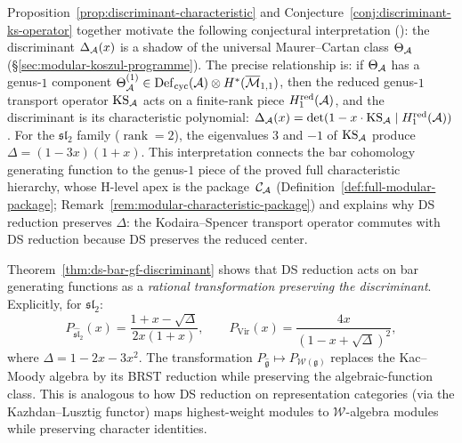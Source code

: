 \begin{remark}\label{rem:discriminant-universal-class}
Proposition~\ref{prop:discriminant-characteristic} and
Conjecture~\ref{conj:discriminant-ks-operator} together motivate the
following conjectural interpretation (\ClaimStatusConjectured): the
discriminant $\Delta_{\mathcal{A}}(x)$ is a shadow of the universal
Maurer--Cartan class $\Theta_{\mathcal{A}}$
(\S\ref{sec:modular-koszul-programme}).  The precise relationship
is: if $\Theta_{\mathcal{A}}$ has a genus-$1$ component
$\Theta_{\mathcal{A}}^{(1)} \in \operatorname{Def}_{\mathrm{cyc}}(\mathcal{A})
\otimes H^*(\overline{\mathcal{M}}_{1,1})$, then the reduced
genus-$1$ transport operator $\operatorname{KS}_{\mathcal{A}}$ acts on
a finite-rank piece $H^{\mathrm{red}}_1(\mathcal{A})$, and the
discriminant is its characteristic polynomial:
$\Delta_{\mathcal{A}}(x) = \det(1 - x \cdot \operatorname{KS}_{\mathcal{A}}
\mid H^{\mathrm{red}}_1(\mathcal{A}))$.  For the $\mathfrak{sl}_2$ family
($\operatorname{rank} = 2$), the eigenvalues $3$ and $-1$ of
$\operatorname{KS}_{\mathcal{A}}$ produce
$\Delta = (1 - 3x)(1 + x)$.  This interpretation connects the
bar cohomology generating function to the genus-$1$ piece of
the proved full characteristic hierarchy, whose H-level apex is
the package~$\mathcal{C}_{\mathcal{A}}$
(Definition~\ref{def:full-modular-package};
Remark~\ref{rem:modular-characteristic-package}) and explains why
DS reduction preserves $\Delta$: the Kodaira--Spencer transport
operator commutes with DS reduction because DS preserves the
reduced center.
\end{remark}

\begin{remark}\label{rem:ds-gf-transformation}
Theorem~\ref{thm:ds-bar-gf-discriminant} shows that DS reduction acts on bar generating functions as a \emph{rational transformation preserving the discriminant}.  Explicitly, for $\mathfrak{sl}_2$:
\[
P_{\widehat{\mathfrak{sl}}_2}(x) = \frac{1 + x - \sqrt{\Delta}}{2x(1+x)},
\qquad
P_{\mathrm{Vir}}(x) = \frac{4x}{(1 - x + \sqrt{\Delta})^2},
\]
where $\Delta = 1 - 2x - 3x^2$.  The transformation $P_{\widehat{\mathfrak{g}}} \mapsto P_{\mathcal{W}(\mathfrak{g})}$ replaces the Kac--Moody algebra by its BRST reduction while preserving the algebraic-function class.  This is analogous to how DS reduction on representation categories (via the Kazhdan--Lusztig functor) maps highest-weight modules to $\mathcal{W}$-algebra modules while preserving character identities.
\end{remark}

